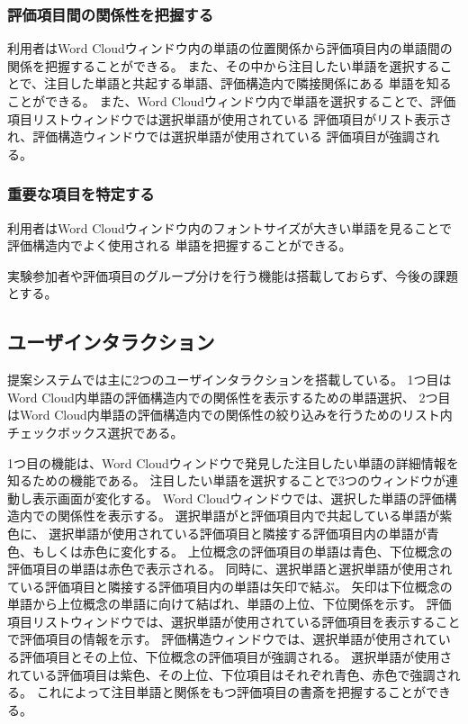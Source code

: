 \documentclass[syuuron]{kuee}
\begin{document}
			\subsubsection{評価項目間の関係性を把握する}
				利用者はWord Cloudウィンドウ内の単語の位置関係から評価項目内の単語間の関係を把握することができる。
				また、その中から注目したい単語を選択することで、注目した単語と共起する単語、評価構造内で隣接関係にある
				単語を知ることができる。
				また、Word Cloudウィンドウ内で単語を選択することで、評価項目リストウィンドウでは選択単語が使用されている
				評価項目がリスト表示され、評価構造ウィンドウでは選択単語が使用されている
				評価項目が強調される。
			\subsubsection{重要な項目を特定する}
				利用者はWord Cloudウィンドウ内のフォントサイズが大きい単語を見ることで評価構造内でよく使用される
				単語を把握することができる。
			
			実験参加者や評価項目のグループ分けを行う機能は搭載しておらず、今後の課題とする。
		\subsection{ユーザインタラクション}
			提案システムでは主に2つのユーザインタラクションを搭載している。
			1つ目はWord Cloud内単語の評価構造内での関係性を表示するための単語選択、
			2つ目はWord Cloud内単語の評価構造内での関係性の絞り込みを行うためのリスト内チェックボックス選択である。
			
			1つ目の機能は、Word Cloudウィンドウで発見した注目したい単語の詳細情報を知るための機能である。
			注目したい単語を選択することで3つのウィンドウが連動し表示画面が変化する。
			Word Cloudウィンドウでは、選択した単語の評価構造内での関係性を表示する。
			選択単語がと評価項目内で共起している単語が紫色に、
			選択単語が使用されている評価項目と隣接する評価項目内の単語が青色、もしくは赤色に変化する。
			上位概念の評価項目の単語は青色、下位概念の評価項目の単語は赤色で表示される。
			同時に、選択単語と選択単語が使用されている評価項目と隣接する評価項目内の単語は矢印で結ぶ。
			矢印は下位概念の単語から上位概念の単語に向けて結ばれ、単語の上位、下位関係を示す。
			評価項目リストウィンドウでは、選択単語が使用されている評価項目を表示することで評価項目の情報を示す。
			評価構造ウィンドウでは、選択単語が使用されている評価項目とその上位、下位概念の評価項目が強調される。
			選択単語が使用されている評価項目は紫色、その上位、下位項目はそれぞれ青色、赤色で強調される。
			これによって注目単語と関係をもつ評価項目の書斎を把握することができる。
			
\end{document}
